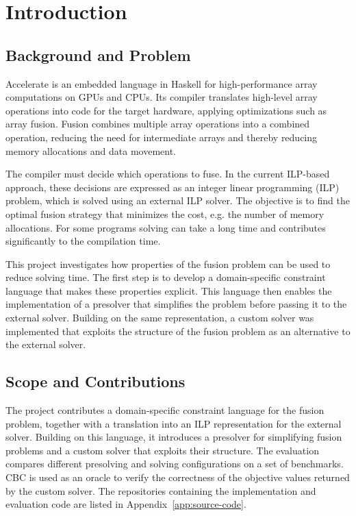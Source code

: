 \section{Introduction}

\subsection{Background and Problem}

Accelerate is an embedded language in Haskell for high-performance array computations on GPUs and CPUs.
Its compiler translates high-level array operations into code for the target hardware, applying optimizations such as array fusion.
Fusion combines multiple array operations into a combined operation, reducing the need for intermediate arrays and thereby reducing memory allocations and data movement.

The compiler must decide which operations to fuse.
In the current ILP-based approach, these decisions are expressed as an integer linear programming (ILP) problem, which is solved using an external ILP solver.
The objective is to find the optimal fusion strategy that minimizes the cost, e.g. the number of memory allocations.
For some programs solving can take a long time and contributes significantly to the compilation time.

This project investigates how properties of the fusion problem can be used to reduce solving time.
The first step is to develop a domain-specific constraint language that makes these properties explicit.
This language then enables the implementation of a presolver that simplifies the problem before passing it to the external solver.
Building on the same representation, a custom solver was implemented that exploits the structure of the fusion problem as an alternative to the external solver.

\subsection{Scope and Contributions}

The project contributes a domain-specific constraint language for the fusion problem, together with a translation into an ILP representation for the external solver.
Building on this language, it introduces a presolver for simplifying fusion problems and a custom solver that exploits their structure.
The evaluation compares different presolving and solving configurations on a set of benchmarks.
CBC is used as an oracle to verify the correctness of the objective values returned by the custom solver.
The repositories containing the implementation and evaluation code are listed in Appendix~\ref{app:source-code}.

